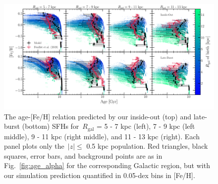 \documentclass[fleqn, usenatbib]{mnras}
\begin{document}
\begin{figure} 
\centering 
\includegraphics[scale = 0.35]{amr_insideout_vs_lateburst_fe.pdf} 
\caption{The age-[Fe/H] relation predicted by our inside-out (top) and 
late-burst (bottom) SFHs for~$R_\text{gal}$ = 5 - 7 kpc (left), 7 - 9 kpc 
(left middle), 9 - 11 kpc (right middle), and 11 - 13 kpc (right). Each panel 
plots only the~$\left|z\right|\leq$ 0.5 kpc population. Red triangles, black 
squares, error bars, and background points are as in 
Fig.~\ref{fig:age_alpha} for the corresponding 
Galactic region, but with our simulation prediction quantified in 
0.05-dex bins in [Fe/H]. } 
\label{fig:amr_insideout_vs_lateburst_fe} 
\end{figure} 

\end{document}
